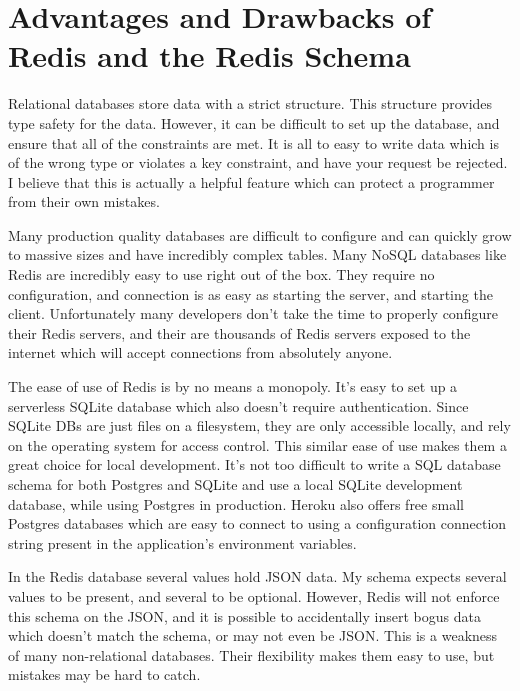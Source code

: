 \documentclass[12pt]{article}
\begin{document}
\section{Advantages and Drawbacks of Redis and the Redis Schema}
Relational databases store data with a strict structure. This structure provides type safety for the data. However, it can be difficult to set up the database, and ensure that all of the constraints are met.  It is all to easy to write data which is of the wrong type or violates a key constraint, and have your request be rejected. I believe that this is actually a helpful feature which can protect a programmer from their own mistakes.

Many production quality databases are difficult to configure and can quickly grow to massive sizes and have incredibly complex tables. Many NoSQL databases like Redis are incredibly easy to use right out of the box. They require no configuration, and connection is as easy as starting the server, and starting the client. Unfortunately many developers don't take the time to properly configure their Redis servers, and their are thousands of Redis servers exposed to the internet which will accept connections from absolutely anyone.  

The ease of use of Redis is by no means a monopoly. It's easy to set up a serverless SQLite database which also doesn't require authentication. Since SQLite DBs are just files on a filesystem, they are only accessible locally, and rely on the operating system for access control. This similar ease of use makes them a great choice for local development. It's not too difficult to write a SQL database schema for both Postgres and SQLite and use a local SQLite development database, while using Postgres in production. Heroku also offers free small Postgres databases which are easy to connect to using a configuration connection string present in the application's environment variables.

In the Redis database several values hold JSON data. My schema expects several values to be present, and several to be optional. However, Redis will not enforce this schema on the JSON, and it is possible to accidentally insert bogus data which doesn't match the schema, or may not even be JSON. This is a weakness of many non-relational databases. Their flexibility makes them easy to use, but mistakes may be hard to catch.
\end{document}
